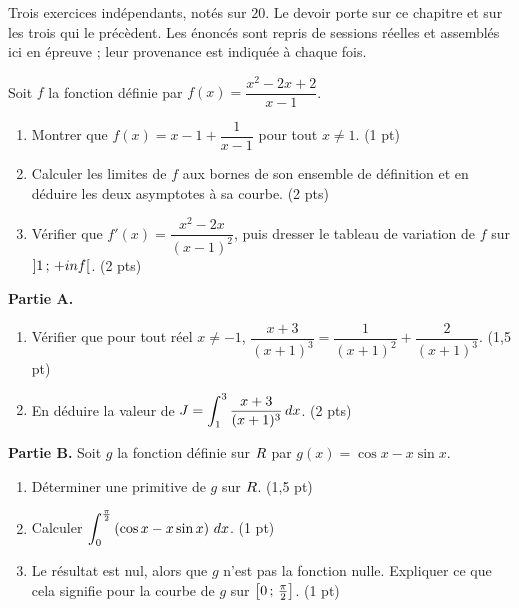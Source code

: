 \begin{devoir}[2 heures]
Trois exercices indépendants, notés sur $20$. Le devoir porte sur ce chapitre
et sur les trois qui le précèdent. Les énoncés sont repris de sessions réelles
et assemblés ici en épreuve ; leur provenance est indiquée à chaque fois.

Soit $f$ la fonction définie par $f(x) = \dfrac{x^{2}-2x+2}{x-1}$.
\begin{enumerate}[label=\textbf{\arabic*.}, leftmargin=*, itemsep=0.2em]
  \item Montrer que $f(x) = x-1+\dfrac{1}{x-1}$ pour tout $x \neq 1$.
        \hfill\textup{(1 pt)}
  \item Calculer les limites de $f$ aux bornes de son ensemble de définition
        et en déduire les deux asymptotes à sa courbe. \hfill\textup{(2 pts)}
  \item Vérifier que $f'(x) = \dfrac{x^{2}-2x}{(x-1)^{2}}$, puis dresser le
        tableau de variation de $f$ sur $\left]1\,;\,+inf\right[$.
        \hfill\textup{(2 pts)}
\end{enumerate}

\textbf{Partie A.}
\begin{enumerate}[label=\textbf{\arabic*.}, leftmargin=*, itemsep=0.2em]
  \item Vérifier que pour tout réel $x \neq -1$,
        $\dfrac{x+3}{(x+1)^{3}} = \dfrac{1}{(x+1)^{2}}+\dfrac{2}{(x+1)^{3}}$.
        \hfill\textup{(1,5 pt)}
  \item En déduire la valeur de
        $\displaystyle J = \int_{1}^{3}\frac{x+3}{(x+1)^{3}}\,dx$.
        \hfill\textup{(2 pts)}
\end{enumerate}
\textbf{Partie B.} Soit $g$ la fonction définie sur $R$ par
$g(x) = \cos x-x\sin x$.
\begin{enumerate}[label=\textbf{\arabic*.}, leftmargin=*, itemsep=0.2em, resume]
  \item Déterminer une primitive de $g$ sur $R$. \hfill\textup{(1,5 pt)}
  \item Calculer
        $\displaystyle\int_{0}^{\frac{\pi}{2}}\left(\cos x-x\sin x\right)\,dx$.
        \hfill\textup{(1 pt)}
  \item Le résultat est nul, alors que $g$ n'est pas la fonction nulle.
        Expliquer ce que cela signifie pour la courbe de $g$ sur
        $\left[0\,;\,\frac{\pi}{2}\right]$. \hfill\textup{(1 pt)}
\end{enumerate}


\end{devoir}
